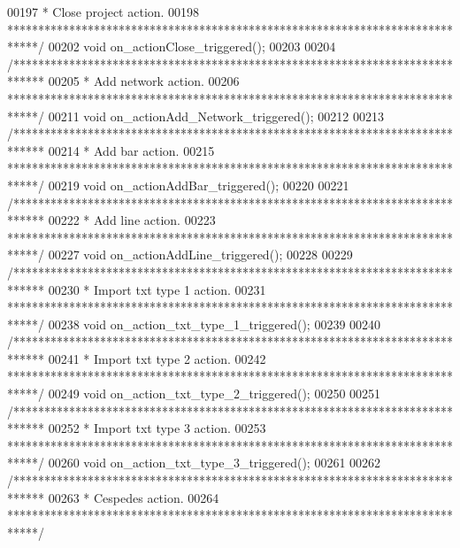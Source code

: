 \begin{DoxyCode}
00197 \textcolor{comment}{  * Close project action.}
00198 \textcolor{comment}{  *****************************************************************************/}
00202   \textcolor{keywordtype}{void} on\_actionClose\_triggered();
00203 
00204   \textcolor{comment}{/*****************************************************************************}
00205 \textcolor{comment}{  * Add network action.}
00206 \textcolor{comment}{  *****************************************************************************/}
00211   \textcolor{keywordtype}{void} on\_actionAdd\_Network\_triggered();
00212 
00213   \textcolor{comment}{/*****************************************************************************}
00214 \textcolor{comment}{  * Add bar action.}
00215 \textcolor{comment}{  *****************************************************************************/}
00219   \textcolor{keywordtype}{void} on\_actionAddBar\_triggered();
00220 
00221   \textcolor{comment}{/*****************************************************************************}
00222 \textcolor{comment}{  * Add line action.}
00223 \textcolor{comment}{  *****************************************************************************/}
00227   \textcolor{keywordtype}{void} on\_actionAddLine\_triggered();
00228 
00229   \textcolor{comment}{/*****************************************************************************}
00230 \textcolor{comment}{  * Import txt type 1 action.}
00231 \textcolor{comment}{  *****************************************************************************/}
00238   \textcolor{keywordtype}{void} on\_action\_txt\_type\_1\_triggered();
00239 
00240   \textcolor{comment}{/*****************************************************************************}
00241 \textcolor{comment}{  * Import txt type 2 action.}
00242 \textcolor{comment}{  *****************************************************************************/}
00249   \textcolor{keywordtype}{void} on\_action\_txt\_type\_2\_triggered();
00250 
00251   \textcolor{comment}{/*****************************************************************************}
00252 \textcolor{comment}{  * Import txt type 3 action.}
00253 \textcolor{comment}{  *****************************************************************************/}
00260   \textcolor{keywordtype}{void} on\_action\_txt\_type\_3\_triggered();
00261 
00262   \textcolor{comment}{/*****************************************************************************}
00263 \textcolor{comment}{  * Cespedes action.}
00264 \textcolor{comment}{  *****************************************************************************/}

\end{DoxyCode}
